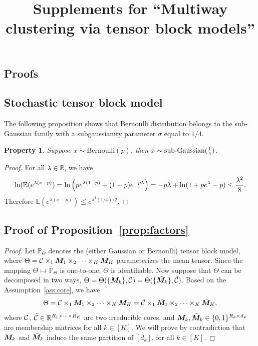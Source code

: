 \documentclass{article}
\title{Supplements for ``Multiway clustering via tensor block models''}
\newtheorem{property}{Property}
\begin{document}
\maketitle

\vspace{-2cm}
\begin{appendices}
\section{Proofs}
\subsection{Stochastic tensor block model}
The following proposition shows that Bernoulli distribution belongs to the sub-Gaussian family with a subgaussianity parameter $\sigma$ equal to $1/4$.
\begin{property}
Suppose $x \sim \text{Bernoulli}(p)$, then $x\sim \text{sub-Gaussian}({1\over 4})$.
\end{property}
\begin{proof} For all $\lambda \in \mathbb{R}$, we have
\[
\ln(\mathbb{E}(e^{\lambda(x-p)})=\ln\left(pe^{\lambda(1-p)} +(1-p)e^{-p\lambda}\right)=-p\lambda +\ln (1+pe^\lambda  -p)\leq {\lambda ^2\over 8}.
\]
Therefore $\mathbb{E}(e^{\lambda (x-p)})\leq e^{\lambda^2(1/4)/2}$.
\end{proof}

\subsection{Proof of Proposition~\ref{prop:factors}}
\begin{proof}
Let $\mathbb{P}_{\Theta}$ denotes the (either Gaussian or Bernoulli) tensor block model, where $\Theta=\mathcal{C} \times_1\bm M_1\times_2\cdots\times_K\bm M_K$ parameterizes the mean tensor. Since the mapping $\Theta\mapsto\mathbb{P}_{\Theta}$ is one-to-one, $\Theta$ is identifiable. Now suppose that $\Theta$ can be decomposed in two ways, $\Theta=\Theta(\{\bm M_k\}, \mathcal{C})=\Theta(\{\tilde {\bm M}_k\}, \tilde {\mathcal{C}})$. Based on the Assumption~\ref{ass:core}, we have
\begin{equation}\label{eq:equality}
\Theta=\mathcal{C} \times_1\bm M_1\times_2\cdots\times_K\bm M_K=\tilde {\mathcal{C}} \times_1\tilde {\bm M}_1\times_2\cdots\times_K\tilde  {\bm M}_K,
\end{equation}
where $\mathcal{C}$, $\tilde {\mathcal{C}}\in\mathbb{R}^{R_1\times \cdots \times R_K}$ are two irreducible cores, and $\bm M_k,\tilde {\bm M}_k\in\{0,1\}^{R_k\times d_k}$ are membership matrices for all $k\in[K]$. We will prove by contradiction that $\bm M_k$ and $\tilde {\bm M}_k$ induce the same partition of $[d_k]$, for all $k\in[K]$. 


\end{proof}
\end{appendices}
\end{document}
